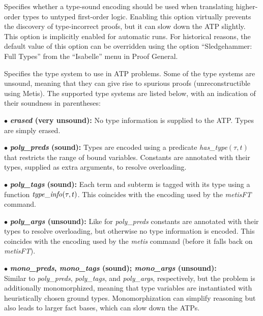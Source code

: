 \documentclass[a4paper,12pt]{article}
\begin{document}
\begin{enum}
Specifies whether a type-sound encoding should be used when translating
higher-order types to untyped first-order logic. Enabling this option virtually
prevents the discovery of type-incorrect proofs, but it can slow down the ATP
slightly. This option is implicitly enabled for automatic runs. For historical
reasons, the default value of this option can be overridden using the option
``Sledgehammer: Full Types'' from the ``Isabelle'' menu in Proof General.

Specifies the type system to use in ATP problems. Some of the type systems are
unsound, meaning that they can give rise to spurious proofs (unreconstructible
using Metis). The supported type systems are listed below, with an indication of
their soundness in parentheses:

\begin{enum}
\item[$\bullet$] \textbf{\textit{erased} (very unsound):} No type information is
supplied to the ATP. Types are simply erased.

\item[$\bullet$] \textbf{\textit{poly\_preds} (sound):} Types are encoded using
a predicate \textit{has\_\allowbreak type\/}$(\tau, t)$ that restricts the range
of bound variables. Constants are annotated with their types, supplied as extra
arguments, to resolve overloading.

\item[$\bullet$] \textbf{\textit{poly\_tags} (sound):} Each term and subterm is
tagged with its type using a function $\mathit{type\_info\/}(\tau, t)$. This
coincides with the encoding used by the \textit{metisFT} command.

\item[$\bullet$] \textbf{\textit{poly\_args} (unsound):}
Like for \textit{poly\_preds} constants are annotated with their types to
resolve overloading, but otherwise no type information is encoded. This
coincides with the encoding used by the \textit{metis} command (before it falls
back on \textit{metisFT}).

\item[$\bullet$]
\textbf{%
\textit{mono\_preds}, \textit{mono\_tags} (sound);
\textit{mono\_args} (unsound):} \\
Similar to \textit{poly\_preds}, \textit{poly\_tags}, and \textit{poly\_args},
respectively, but the problem is additionally monomorphized, meaning that type
variables are instantiated with heuristically chosen ground types.
Monomorphization can simplify reasoning but also leads to larger fact bases,
which can slow down the ATPs.


\end{enum}
\end{enum}
\end{document}

